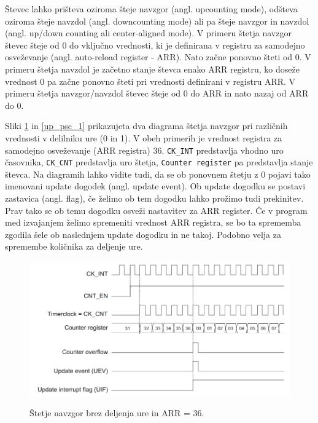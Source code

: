 \documentclass[12pt,letterpaper]{article}
\begin{document}
Števec lahko prišteva oziroma šteje navzgor (angl. upcounting mode), odšteva oziroma šteje navzdol (angl. downcounting mode) ali pa šteje navzgor in navzdol (angl. up/down counting ali center-aligned mode). V primeru štetja navzgor števec šteje od 0 do vključno vrednosti, ki je definirana v registru za samodejno osveževanje (angl. auto-reload register - ARR). Nato začne ponovno šteti od 0. V primeru štetja navzdol je začetno stanje števca enako ARR registru, ko doseže vrednost 0 pa začne ponovno šteti pri vrednosti definirani v registru ARR. V primeru štetja navzgor/navzdol števec šteje od 0 do ARR in nato nazaj od ARR do 0.

Sliki \ref{up_psc_0} in \ref{up_psc_1} prikazujeta dva diagrama štetja navzgor pri različnih vrednosti v delilniku ure (0 in 1). V obeh primerih je vrednost registra za samodejno osveževanje (ARR registra) 36. \texttt{CK\_INT} predstavlja vhodno uro časovnika, \texttt{CK\_CNT} predstavlja uro štetja, \texttt{Counter register} pa predstavlja stanje števca. Na diagramih lahko vidite tudi, da se ob ponovnem štetju z 0 pojavi tako imenovani update dogodek (angl. update event). Ob update dogodku se postavi zastavica (angl. flag), če želimo ob tem dogodku lahko prožimo tudi prekinitev. Prav tako se ob temu dogodku osveži nastavitev za ARR register. Če v program med izvajanjem želimo spremeniti vrednost ARR registra, se bo ta sprememba zgodila šele ob naslednjem update dogodku in ne takoj. Podobno velja za spremembe količnika za deljenje ure.

\begin{figure}[ht!]
  \centering
  \caption{Štetje navzgor brez deljenja ure in ARR = 36.}
  \includegraphics[width=360pt]{images/vaja7/prescaler0.png}
  \label{up_psc_0}
\end{figure}
\end{document}
